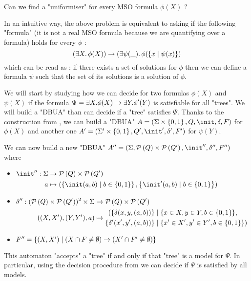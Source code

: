 \documentclass{article}
\begin{document}
\begin{problem}
Can we find a "uniformiser" for every MSO formula $\phi(X)$ ?
\end{problem}


In an intuitive way, the above problem is equivalent to asking if the following "formula" (it is not a real MSO formula
because we are quantifying over a formula) holds for every $\phi$ :
\[ (\exists X.\, \phi(X)) \rightarrow (\exists \psi(\_).\, \phi(\left\{x \mid \psi(x)\right\} ) \]
which can be read as : if there exists a set of solutions for $\phi$ then we can define a formula $\psi$ such that the set of 
its solutions is a solution of $\phi$.

We will start by studying how we can decide for two formulas $\phi(X)$ and $\psi(X)$ if the formula $\Psi = \exists X. \phi (X) \rightarrow \exists Y. \phi' (Y)$
is satisfiable for all "trees". We will build a "DBUA" than can decide if a "tree" satisfies $\Psi$.
Thanks to the construction from , we can build a "DBUA" $A = (\Sigma \times \set{0,1}, Q, \init, \delta, F)$ for $\phi(X)$
and another one $A' = (\Sigma' \times \set{0,1}, Q', \init', \delta', F')$ for $\psi(Y)$.

We can now build a new "DBUA" $A'' = (\Sigma, \parts Q \times \parts {Q'}, \init'', \delta'', F'')$ where
\begin{itemize}
	\item$\begin{aligned}[t]
			      \init'' : \Sigma & \to      \parts Q \times \parts {Q'}                                                          \\
			      a                & \mapsto  ( \setdef{ \init(a,b) } {b \in \set{0,1}}, \setdef{ \init'(a,b) } {b \in \set{0,1}})
		      \end{aligned}$

	\item$\begin{aligned}[t]
			      \delta'' : (\mathcal{P}\left(Q\right) \times \mathcal{P}\left(Q'\right))^2 \times \Sigma & \to      \mathcal{P}\left(Q\right) \times \mathcal{P}\left(Q'\right)                                                 \\
			      ((X,X'),(Y,Y'),a)                                        & \mapsto \begin{aligned}
				                                                                         (\{ \delta(x,y,(a,b)) \}  & \mid  \{x \in X, y \in Y, b \in \left\{0,1\right\}\},     \\
				                                                                         \{ \delta'(x',y',(a,b))\} & \mid  \{x' \in X', y' \in Y', b \in \left\{0,1\right\}\})
			                                                                         \end{aligned}
		      \end{aligned}$

	\item $F'' = \left\{(X,X') \mid (X \cap F \neq \emptyset) \rightarrow (X' \cap F' \neq \emptyset)\right\}$
\end{itemize}
This automaton "accepts" a "tree" if and only if that "tree" is a model for $\Psi$. In particular, using the decision procedure
from  we can decide if $\Psi$ is satisfied by all models.
\end{document}
